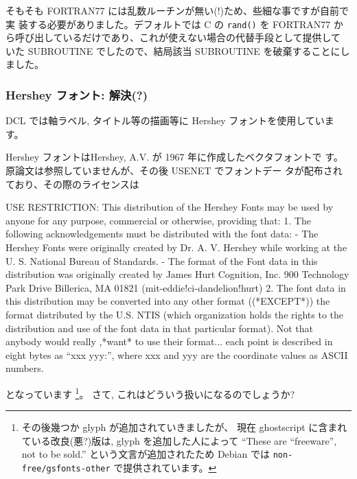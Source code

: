 \documentclass[mingoth,a4paper,twoside]{jsarticle}
\begin{document}
そもそも FORTRAN77 には乱数ルーチンが無い(!)ため、些細な事ですが自前で実
装する必要がありました。デフォルトでは C の \texttt{rand()} を FORTRAN77
から呼び出しているだけであり、これが使えない場合の代替手段として提供して
いた SUBROUTINE でしたので、結局該当 SUBROUTINE を破棄することにしました。


\subsubsection{%
  Hershey フォント: 解決(?)
}

DCL では軸ラベル, タイトル等の描画等に Hershey フォントを使用しています。

Hershey フォントはHershey, A.V. が 1967 年に作成したベクタフォントで
す\cite{Hershey}。原論文は参照していませんが、その後 USENET でフォントデー
タが配布されており、その際のライセンスは

\begin{commandline}
  USE RESTRICTION:
        This distribution of the Hershey Fonts may be used by anyone for
        any purpose, commercial or otherwise, providing that:
                1. The following acknowledgements must be distributed with
                        the font data:
                        - The Hershey Fonts were originally created by Dr.
                                A. V. Hershey while working at the U. S.
                                National Bureau of Standards.
                        - The format of the Font data in this distribution
                                was originally created by
                                        James Hurt
                                        Cognition, Inc.
                                        900 Technology Park Drive
                                        Billerica, MA 01821
                                        (mit-eddie!ci-dandelion!hurt)
                2. The font data in this distribution may be converted into
                   any other format ((*EXCEPT*)) the format distributed by
                   the U.S. NTIS (which organization holds the rights
                   to the distribution and use of the font data in that
                   particular format). Not that anybody would really
                   ,*want* to use their format... each point is described
                   in eight bytes as ``xxx yyy:'', where xxx and yyy are
                   the coordinate values as ASCII numbers.
\end{commandline}
となっています
\footnote{%
  その後幾つか glyph が追加されていきましたが、
  現在 ghostscript に含まれている改良(悪?)版は,
  glyph を追加した人によって
  ``These are ``freeware'', not to be sold.'' という文言が追加されたため
  Debian では \texttt{non-free/gsfonts-other} で提供されています。
}。
さて, これはどういう扱いになるのでしょうか?
\end{document}
